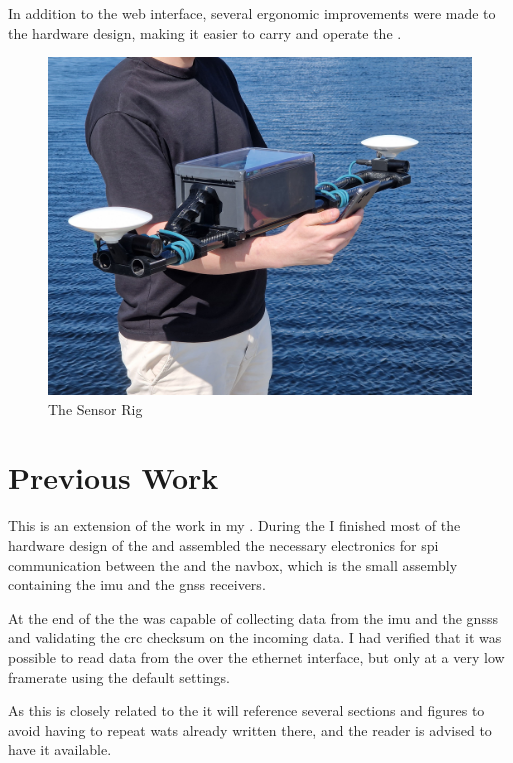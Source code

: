 In addition to the web interface, several ergonomic improvements were made to the hardware design, making it easier to carry and operate the \sr.

\begin{figure}[H]
    \includegraphics[width=\textwidth]{figures/frontpage.jpg}
    \caption{The Sensor Rig}
\end{figure}

\section{Previous Work}
This \master is an extension of the work in my \preproject \cite{martensPortableSensorRig2022}.
During the \preproject I finished most of the hardware design of the \sr
and assembled the necessary electronics for \gls{spi} communication between the \jx and the \gls{navbox}, which is the small assembly containing the \gls{imu} and the \gls{gnss} receivers.

At the end of the \preproject the \sr was capable of collecting data from the \gls{imu} and the \glspl{gnss} and validating the \gls{crc} checksum on the incoming data.
I had verified that it was possible to read data from the \cams over the ethernet interface, but only at a very low framerate using the default settings.

As this \master is closely related to the \preproject it will reference several sections and figures to avoid having to repeat wats already written there, and the reader is advised to have it available.

